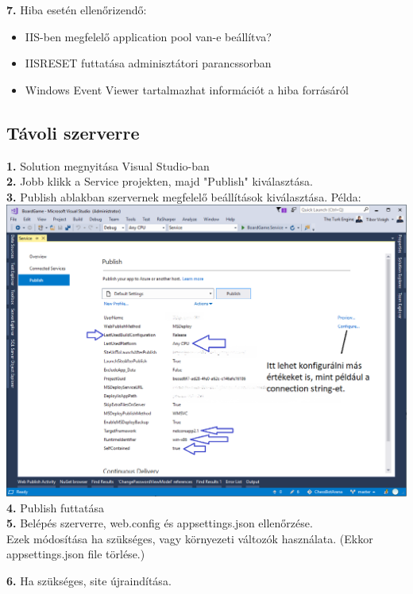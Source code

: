\documentclass[twoside, a4paper, 12pt]{book}
\begin{document}
\noindent \textbf{7.} Hiba esetén ellenőrizendő:
\begin{itemize}
	\item IIS-ben megfelelő application pool van-e beállítva?
	\item IISRESET futtatása adminisztátori parancssorban
	\item Windows Event Viewer tartalmazhat információt a hiba forrásáról
\end{itemize}

\subsection{Távoli szerverre}
\noindent \textbf{1.} Solution megnyitása Visual Studio-ban \\

\noindent \textbf{2.} Jobb klikk a Service projekten, majd "Publish" kiválasztása. \\

\noindent \textbf{3.} Publish ablakban szervernek megfelelő beállítások kiválasztása. Példa: \\
\includegraphics[width=1.0\textwidth]{img/server_prod_run_6.png} \\

\noindent \textbf{4.} Publish futtatása \\

\noindent \textbf{5.} Belépés szerverre, web.config és appsettings.json ellenőrzése. \\
Ezek módosítása ha szükséges, vagy környezeti változók használata. (Ekkor appsettings.json file törlése.)

\noindent \textbf{6.} Ha szükséges, site újraindítása. \\
\end{document}
